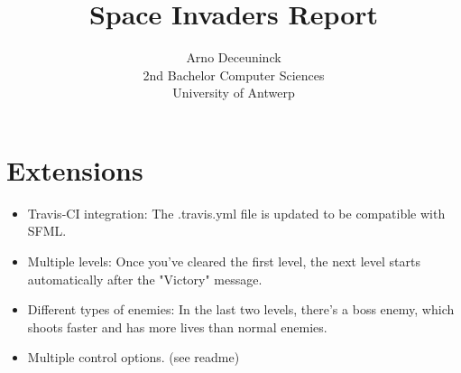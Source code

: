 \documentclass{article}
\title{Space Invaders Report}
\author{Arno Deceuninck\\ 2nd Bachelor Computer Sciences \\ University of Antwerp}
\begin{document}
    \maketitle

    \section{Extensions}
    \begin{itemize}
        \item Travis-CI integration: The .travis.yml file is updated to be compatible with SFML.
        \item Multiple levels: Once you've cleared the first level, the next level starts automatically after the "Victory" message.
        \item Different types of enemies: In the last two levels, there's a boss enemy, which shoots faster and has more lives than normal enemies.
        \item Multiple control options. (see readme)
    \end{itemize}
\end{document}

